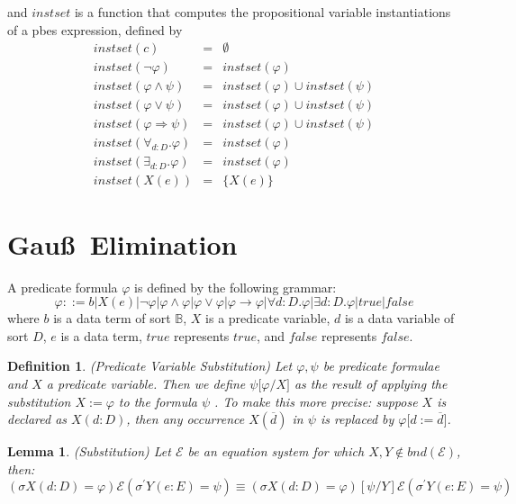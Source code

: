 \documentclass{article}
\newtheorem{definition}[theorem]{Definition}
\newtheorem{lemma}[theorem]{Lemma}
\begin{document}
and $instset$ is a function that computes the propositional variable
instantiations of a pbes expression, defined by%
\begin{eqnarray*}
instset(c) &=&\emptyset  \\
instset(\lnot \varphi ) &=&instset(\varphi ) \\
instset(\varphi \wedge \psi ) &=&instset(\varphi )\cup instset(\psi ) \\
instset(\varphi \vee \psi ) &=&instset(\varphi )\cup instset(\psi ) \\
instset(\varphi \Rightarrow \psi ) &=&instset(\varphi )\cup instset(\psi ) \\
instset(\forall _{d:D}.\varphi ) &=&instset(\varphi ) \\
instset(\exists _{d:D}.\varphi ) &=&instset(\varphi ) \\
instset(X(e)) &=&\{X(e)\}
\end{eqnarray*}

\newpage

\section{Gau\ss\ Elimination}

A predicate formula $\varphi $ is defined by the following grammar:%
\begin{equation*}
\varphi ::=b|X(e)|\lnot \varphi |\varphi \wedge \varphi |\varphi \vee
\varphi |\varphi \rightarrow \varphi |\forall d:D.\varphi |\exists
d:D.\varphi |true |false
\end{equation*}%
where $b$ is a data term of sort $\mathbb{B}$, $X$ is a predicate variable, $%
d$ is a data variable of sort $D$, $e$ is a data term, $true $ represents $%
true$, and $false $ represents $false$.

\begin{definition}
(Predicate Variable Substitution) Let $\varphi ,\psi $ be predicate formulae
and $X$ a predicate variable. Then we define $\psi \lbrack \varphi /X]$ as
the result of applying the substitution $X:=\varphi $ to the formula $\psi $%
. To make this more precise: suppose $X$ is declared as $X(d:D)$, then any
occurrence $X(\overline{d})$ in $\psi $ is replaced by $\varphi \lbrack d:=%
\overline{d}]$.
\end{definition}

\begin{lemma}
(Substitution) Let $\mathcal{E}$ be an equation system for which $X,Y\notin
bnd(\mathcal{E})$, then:%
\begin{equation*}
(\sigma X(d:D)=\varphi )\mathcal{E}(\sigma ^{\prime }Y(e:E)=\psi )\equiv
(\sigma X(d:D)=\varphi )[\psi /Y]\mathcal{E}(\sigma ^{\prime }Y(e:E)=\psi )
\end{equation*}
\end{lemma}
\end{document}
